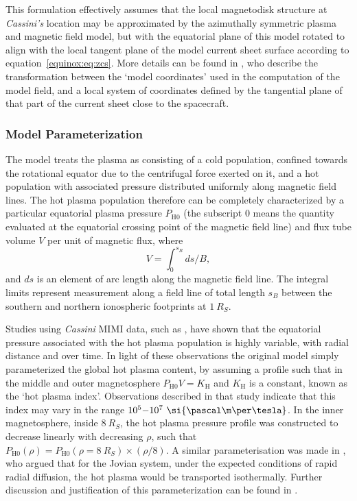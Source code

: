This formulation effectively assumes that the local magnetodisk structure at \textit{Cassini's} location may be approximated by the azimuthally symmetric \citet{achilleos2010a} plasma and magnetic field model, but with the equatorial plane of this model rotated to align with the local tangent plane of the model current sheet surface according to equation~\ref{equinox:eq:zcs}. More details can be found in {\citet{achilleos2014}}, who describe the transformation between the `model coordinates' used in the computation of the model field, and a local system of coordinates defined by the tangential plane of that part of the current sheet close to the spacecraft.

\subsubsection{Model Parameterization}\label{equinox:sec:modelparamzation}
The \citet{achilleos2010a} model treats the plasma as consisting of a cold population, confined towards the rotational equator due to the centrifugal force exerted on it, and a hot population with associated pressure distributed uniformly along magnetic field lines. The hot plasma population therefore can be completely characterized by a particular equatorial plasma pressure $P_\mathrm{H0}$ (the subscript 0 means the quantity evaluated at the equatorial crossing point of the magnetic field line) and flux tube volume $V$ per unit of magnetic flux, where
\begin{equation}\label{equinox:eq:ftv}
V = \int_{0}^{s_{B}} ds/B,
\end{equation}
and $ds$ is an element of arc length along the magnetic field line. The integral limits represent measurement along a field line of total length $s_B$ between the southern and northern ionospheric footprints at $\SI{1}{R_S}$.

Studies using \textit{Cassini} MIMI data, such as \citet{sergis2007, sergis2010}, have shown that the equatorial pressure associated with the hot plasma population is highly variable, with radial distance and over time. In light of these observations the original \citet{achilleos2010a} model simply parameterized the global hot plasma content, by assuming a profile such that in the middle and outer magnetosphere $P_\mathrm{H0}V = K_\mathrm{H}$ and $K_\mathrm{H}$ is a constant, known as the `hot plasma index'. Observations described in that study indicate that this index may vary in the range $10^5{\--}10^7~\si{\pascal\m\per\tesla}$. In the inner magnetosphere, inside $\SI{8}{R_S}$, the hot plasma pressure profile was constructed to decrease linearly with decreasing $\rho$, such that $P_\mathrm{H0}(\rho) = P_\mathrm{H0}(\rho = \SI{8}{R_S})\times(\rho/8)$. A similar parameterisation was made in \citet{caudal1986}, who argued that for the Jovian system, under the expected conditions of rapid radial diffusion, the hot plasma would be transported isothermally. Further discussion and justification of this parameterization can be found in \citet{achilleos2010a}.

